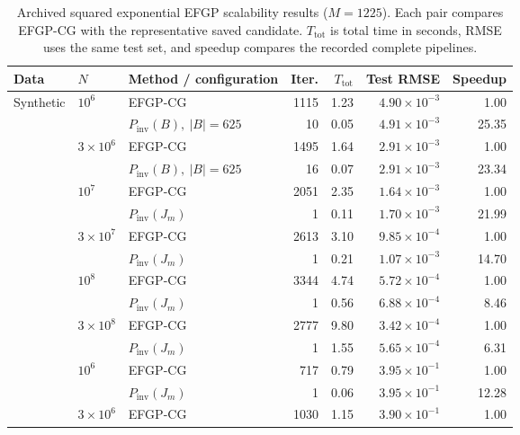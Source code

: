 \begin{table}[H]
\centering
\footnotesize
\setlength{\tabcolsep}{3.5pt}
\caption{Archived squared exponential EFGP scalability results (\(M=1225\)).
Each pair compares EFGP-CG with the representative saved candidate.
\(T_{\mathrm{tot}}\) is total time in seconds, RMSE uses the same test set,
and speedup compares the recorded complete pipelines.}
\label{tab:se-scalability}
\begin{tabular}{lllrrrr}
\toprule
Data & \(N\) & Method / configuration & Iter. &
\(T_{\mathrm{tot}}\) & Test RMSE & Speedup \\
\midrule
\multirow{12}{*}{Synthetic}
& \multirow{2}{*}{\(10^6\)} & EFGP-CG & 1115 & 1.23 & \(4.90{\times}10^{-3}\) & 1.00 \\
& & \(P_{\mathrm{inv}}(B),\ |B|=625\) & 10 & 0.05 & \(4.91{\times}10^{-3}\) & 25.35 \\
& \multirow{2}{*}{\(3{\times}10^6\)} & EFGP-CG & 1495 & 1.64 & \(2.91{\times}10^{-3}\) & 1.00 \\
& & \(P_{\mathrm{inv}}(B),\ |B|=625\) & 16 & 0.07 & \(2.91{\times}10^{-3}\) & 23.34 \\
& \multirow{2}{*}{\(10^7\)} & EFGP-CG & 2051 & 2.35 & \(1.64{\times}10^{-3}\) & 1.00 \\
& & \(P_{\mathrm{inv}}(J_m)\) & 1 & 0.11 & \(1.70{\times}10^{-3}\) & 21.99 \\
& \multirow{2}{*}{\(3{\times}10^7\)} & EFGP-CG & 2613 & 3.10 & \(9.85{\times}10^{-4}\) & 1.00 \\
& & \(P_{\mathrm{inv}}(J_m)\) & 1 & 0.21 & \(1.07{\times}10^{-3}\) & 14.70 \\
& \multirow{2}{*}{\(10^8\)} & EFGP-CG & 3344 & 4.74 & \(5.72{\times}10^{-4}\) & 1.00 \\
& & \(P_{\mathrm{inv}}(J_m)\) & 1 & 0.56 & \(6.88{\times}10^{-4}\) & 8.46 \\
& \multirow{2}{*}{\(3{\times}10^8\)} & EFGP-CG & 2777 & 9.80 & \(3.42{\times}10^{-4}\) & 1.00 \\
& & \(P_{\mathrm{inv}}(J_m)\) & 1 & 1.55 & \(5.65{\times}10^{-4}\) & 6.31 \\
\addlinespace[1pt]
\multirow{12}{*}{USGS}
& \multirow{2}{*}{\(10^6\)} & EFGP-CG & 717 & 0.79 & \(3.95{\times}10^{-1}\) & 1.00 \\
& & \(P_{\mathrm{inv}}(J_m)\) & 1 & 0.06 & \(3.95{\times}10^{-1}\) & 12.28 \\
& \multirow{2}{*}{\(3{\times}10^6\)} & EFGP-CG & 1030 & 1.15 & \(3.90{\times}10^{-1}\) & 1.00 \\

\end{tabular}
\end{table}
